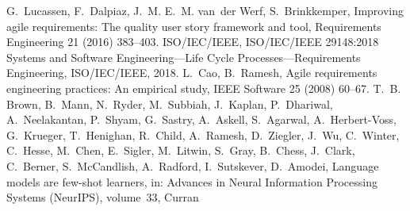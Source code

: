 \documentclass[10pt,a4paper]{article}
\providecommand{\bibinfo}[2]{#2}
\begin{document}
\FloatBarrier
\begin{thebibliography}{24}
\bibinfo{author}{G.~Lucassen}, \bibinfo{author}{F.~Dalpiaz},
  \bibinfo{author}{J.~M. E.~M. van~der Werf}, \bibinfo{author}{S.~Brinkkemper},
\newblock \bibinfo{title}{Improving agile requirements: The quality user story
  framework and tool},
\newblock \bibinfo{journal}{Requirements Engineering} \bibinfo{volume}{21}
  (\bibinfo{year}{2016}) \bibinfo{pages}{383--403}.
\bibinfo{author}{{ISO/IEC/IEEE}}, \bibinfo{title}{ISO/IEC/IEEE 29148:2018
  Systems and Software Engineering---Life Cycle Processes---Requirements
  Engineering}, \bibinfo{organization}{ISO/IEC/IEEE}, \bibinfo{year}{2018}.
\bibinfo{author}{L.~Cao}, \bibinfo{author}{B.~Ramesh},
\newblock \bibinfo{title}{Agile requirements engineering practices: An
  empirical study},
\newblock \bibinfo{journal}{IEEE Software} \bibinfo{volume}{25}
  (\bibinfo{year}{2008}) \bibinfo{pages}{60--67}.
\bibinfo{author}{T.~B. Brown}, \bibinfo{author}{B.~Mann},
  \bibinfo{author}{N.~Ryder}, \bibinfo{author}{M.~Subbiah},
  \bibinfo{author}{J.~Kaplan}, \bibinfo{author}{P.~Dhariwal},
  \bibinfo{author}{A.~Neelakantan}, \bibinfo{author}{P.~Shyam},
  \bibinfo{author}{G.~Sastry}, \bibinfo{author}{A.~Askell},
  \bibinfo{author}{S.~Agarwal}, \bibinfo{author}{A.~Herbert-Voss},
  \bibinfo{author}{G.~Krueger}, \bibinfo{author}{T.~Henighan},
  \bibinfo{author}{R.~Child}, \bibinfo{author}{A.~Ramesh},
  \bibinfo{author}{D.~Ziegler}, \bibinfo{author}{J.~Wu},
  \bibinfo{author}{C.~Winter}, \bibinfo{author}{C.~Hesse},
  \bibinfo{author}{M.~Chen}, \bibinfo{author}{E.~Sigler},
  \bibinfo{author}{M.~Litwin}, \bibinfo{author}{S.~Gray},
  \bibinfo{author}{B.~Chess}, \bibinfo{author}{J.~Clark},
  \bibinfo{author}{C.~Berner}, \bibinfo{author}{S.~McCandlish},
  \bibinfo{author}{A.~Radford}, \bibinfo{author}{I.~Sutskever},
  \bibinfo{author}{D.~Amodei},
\newblock \bibinfo{title}{Language models are few-shot learners},
\newblock in: \bibinfo{booktitle}{Advances in Neural Information Processing
  Systems (NeurIPS)}, volume~\bibinfo{volume}{33}, \bibinfo{publisher}{Curran
}
\end{thebibliography}
\end{document}

